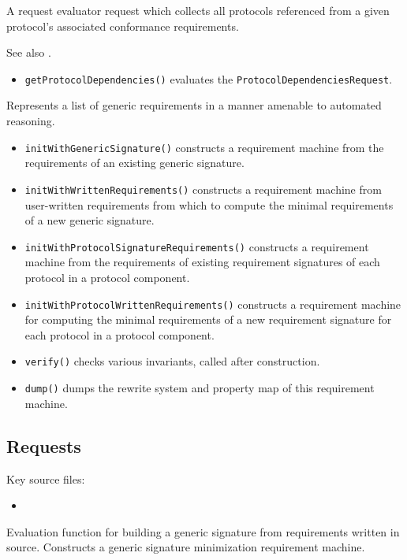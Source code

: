 \documentclass[../generics]{subfiles}
\begin{document}
A request evaluator request which collects all protocols referenced from a given protocol's associated conformance requirements.

See also .
\begin{itemize}
\item \texttt{getProtocolDependencies()} evaluates the \texttt{ProtocolDependenciesRequest}.
\end{itemize}

Represents a list of generic requirements in a manner amenable to automated reasoning.
\begin{itemize}
\item \texttt{initWithGenericSignature()} constructs a requirement machine from the requirements of an existing generic signature.
\item \texttt{initWithWrittenRequirements()} constructs a requirement machine from user-written requirements from which to compute the minimal requirements of a new generic signature.
\item \texttt{initWithProtocolSignatureRequirements()} constructs a requirement machine from the requirements of existing requirement signatures of each protocol in a protocol component.
\item \texttt{initWithProtocolWrittenRequirements()} constructs a requirement machine for computing the minimal requirements of a new requirement signature for each protocol in a protocol component.
\item \texttt{verify()} checks various invariants, called after construction.
\item \texttt{dump()} dumps the rewrite system and property map of this requirement machine.
\end{itemize}

\subsection*{Requests}

Key source files:
\begin{itemize}
\item {}
\end{itemize}

Evaluation function for building a generic signature from requirements written in source. Constructs a generic signature minimization requirement machine.
\end{document}
